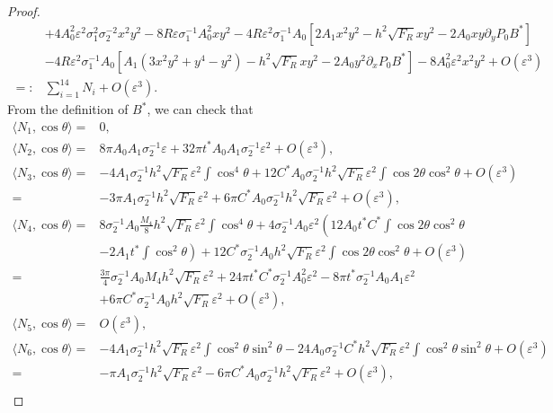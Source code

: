 \documentclass[12pt,reqno]{amsart}
\numberwithin{equation}{section}
\theoremstyle{definition}
\theoremstyle{remark}
\begin{document}
\begin{proof}
\begin{equation}
\begin{split}
& +4 A_0^2 \varepsilon^2 \sigma_1^2 \sigma_2^{-2} x^2 y^2 
  -8 R \varepsilon \sigma_1^{-1} A_0^2 x y^2 -4 R \varepsilon^2 \sigma_1^{-1} A_0\left[2 A_1 x^2 y^2-h^2 \sqrt{F_R} x y^2-2 A_0 x y \partial_y  P_0 B^*\right]  \\
& -4 R \varepsilon^2 \sigma_1^{-1} A_0\left[A_1\left(3 x^2 y^2+y^4-y^2\right)-h^2 \sqrt{F_R} x y^2-2 A_0 y^2 \partial_x  P_0 B^*\right]-8A_0^2\varepsilon^2    x^2y^2+O(\varepsilon^3)\\
=:&\sum_{i=1}^{14}N_i+O(\varepsilon^3).
\end{split}
\end{equation}
From the definition of $ B^* $, we can check that
\begin{align*}
\langle N_1,\cos\theta \rangle=&0,\\
\langle N_2,\cos\theta \rangle=&8\pi A_0A_1 \sigma_2^{-1} \varepsilon+32\pi t^* A_0A_1 \sigma_2^{-1} \varepsilon^2+O(\varepsilon^3),\\
\langle N_3,\cos\theta \rangle=&-4 A_1 \sigma_2^{-1} h^2 \sqrt{F_R}\varepsilon^2 \int \cos ^4 \theta  +12C^* A_0 \sigma_2^{-1} h^2 \sqrt{F_R} \varepsilon^2 \int \cos 2 \theta   \cos ^2 \theta  +O(\varepsilon^3)\\
=&-3\pi A_1 \sigma_2^{-1} h^2 \sqrt{F_R}\varepsilon^2  +6\pi C^* A_0 \sigma_2^{-1} h^2 \sqrt{F_R} \varepsilon^2  +O(\varepsilon^3) ,\\
\langle N_4,\cos\theta \rangle=&8 \sigma_2^{-1} A_0  \frac{M_4}{8}   h^2 \sqrt{F_R}  \varepsilon^2  \int \cos ^4 \theta + 4 \sigma_2^{-1} A_0\varepsilon^2\left(12 A_0 t^*  C^*   \int \cos 2 \theta  \cos ^2 \theta  \right . \\
& \left .-2 A_1 t^*\int \cos ^2 \theta \right)+ 12 C^*  \sigma_2^{-1} A_0  h^2 \sqrt{F_R}  \varepsilon^2\int \cos 2 \theta   \cos ^2 \theta  +O(\varepsilon^3)\\
=& \frac{3\pi}{4}\sigma_2^{-1} A_0 M_4   h^2 \sqrt{F_R} \varepsilon^2 + 24 \pi t^*  C^*\sigma_2^{-1} A_0^2  \varepsilon^2  -8\pi t^*\sigma_2^{-1} A_0   A_1  \varepsilon^2\\
& + 6\pi C^*  \sigma_2^{-1} A_0  h^2 \sqrt{F_R} \varepsilon^2 +O(\varepsilon^3), \\
\langle N_5,\cos\theta \rangle=& O(\varepsilon^3),\\
\langle N_6,\cos\theta \rangle=&-4 A_1 \sigma_2^{-1} h^2 \sqrt{F_R}\varepsilon^2 \int \cos ^2 \theta \sin ^2 \theta -24 A_0 \sigma_2^{-1} C^* h^2 \sqrt{F_R}\varepsilon^2 \int \cos ^2 \theta \sin ^2 \theta+O(\varepsilon^3) \\
=&-\pi A_1 \sigma_2^{-1} h^2 \sqrt{F_R} \varepsilon^2  -6\pi C^* A_0 \sigma_2^{-1} h^2 \sqrt{F_R} \varepsilon^2 +O(\varepsilon^3),\\

\end{align*}
\end{proof}
\end{document}
